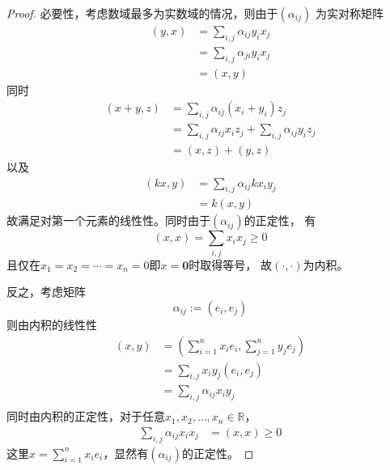 \documentclass[cn]{homework}
\begin{document}
    \problem
    \begin{proof}
        必要性，考虑数域最多为实数域的情况，则由于$(\alpha_{ij})$
        为实对称矩阵
        \[\begin{aligned}
            (y,x)&=
            \sum_{i,j}\alpha_{ij}y_ix_j\\
            &=\sum_{i,j}\alpha_{ji}y_ix_j\\
            &=(x,y)
        \end{aligned}\]
        同时
        \[\begin{aligned}
            (x+y,z)&=\sum_{i,j}\alpha_{ij}(x_i+y_i)z_j\\
            &=\sum_{i,j}\alpha_{ij}x_iz_j
              +\sum_{i,j}\alpha_{ij}y_iz_j\\
            &=(x,z)+(y,z)
        \end{aligned}\]
        以及
        \[\begin{aligned}
            (kx,y)&=\sum_{i,j}\alpha_{ij}kx_iy_j\\
            &=k(x,y)
        \end{aligned}\]
        故满足对第一个元素的线性性。同时由于$(\alpha_{ij})$的正定性，
        有
        \[(x,x)=\sum_{i,j}x_ix_j\geq 0\]
        且仅在$x_1=x_2=\cdots=x_n=0$即$x=\boldsymbol 0$时取得等号，
        故$(\cdot,\cdot)$为内积。

        反之，考虑矩阵
        \[\alpha_{ij}:=(e_i,e_j)\]
        则由内积的线性性
        \[\begin{aligned}
            (x,y)&=\left(\sum_{i=1}^nx_ie_i,\sum_{j=1}^ny_je_j\right)\\
            &=\sum_{i,j}x_iy_j(e_i,e_j)\\
            &=\sum_{i,j}\alpha_{ij}x_iy_j\\
        \end{aligned}\]
        同时由内积的正定性，对于任意$x_1,x_2,\ldots,x_n\in\mathbb R$，
        \[\begin{aligned}
            \sum_{i,j}\alpha_{ij}x_ix_j
            &=(x,x)\geq 0
        \end{aligned}\]
        这里$x=\sum_{i=1}^nx_ie_i$，显然有$(\alpha_{ij})$的正定性。
    \end{proof}
\end{document}
